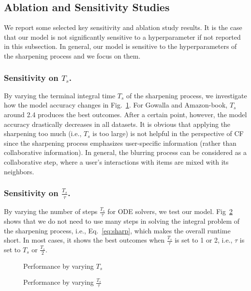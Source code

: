 \documentclass[sigconf,natbib=true]{acmart}
\begin{document}
\subsection{Ablation and Sensitivity Studies}
We report some selected key sensitivity and ablation study results. It is the case that our model is not significantly sensitive to a hyperparameter if not reported in this subsection. In general, our model is sensitive to the hyperparameters of the sharpening process and we focus on them.

\subsubsection{Sensitivity on $T_s$.} By varying the terminal integral time $T_s$ of the sharpening process, we investigate how the model accuracy changes in Fig.~\ref{fig:terminal_time}. For Gowalla and Amazon-book, $T_s$ around 2.4 produces the best outcomes. After a certain point, however, the model accuracy drastically decreases in all datasets. It is obvious that applying the sharpening too much (i.e., $T_s$ is too large) is not helpful in the perspective of CF since the sharpening process emphasizes user-specific information (rather than collaborative information). In general, the blurring process can be considered as a collaborative step, where a user's interactions with items are mixed with its neighbors.

\subsubsection{Sensitivity on $\frac{T_s}{\tau}$.} By varying the number of steps $\frac{T_s}{\tau}$ for ODE solvers, we test our model. Fig~\ref{fig:steps} shows that we do not need to use many steps in solving the integral problem of the sharpening process, i.e., Eq.~\eqref{eq:sharp}, which makes the overall runtime short. In most cases, it shows the best outcomes when $\frac{T_s}{\tau}$ is set to 1 or 2, i.e., $\tau$ is set to $T_s$ or $\frac{T_s}{2}$.

\begin{figure}[t]
    \centering
    \caption{Performance by varying $T_s$}
    \label{fig:terminal_time}
\end{figure}
\begin{figure}[t]
    \centering
    \caption{Performance by varying $\frac{T_s}{\tau}$}
    \label{fig:steps}
\end{figure}
\end{document}
